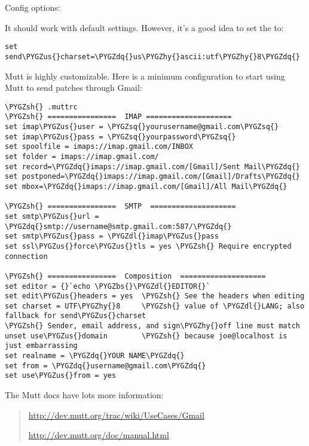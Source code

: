 \documentclass[a4paper,8pt,english]{sphinxmanual}
\def\PYGZbs{\char`\\}
\def\PYGZus{\char`\_}
\def\PYGZsh{\char`\#}
\def\PYGZdl{\char`\$}
\def\PYGZhy{\char`\-}
\def\PYGZsq{\char`\'}
\def\PYGZdq{\char`\"}
\renewcommand\PYGZsq{\textquotesingle}
\begin{document}
Config options:

It should work with default settings.
However, it's a good idea to set the  to:

\begin{Verbatim}[commandchars=\\\{\}]
set send\PYGZus{}charset=\PYGZdq{}us\PYGZhy{}ascii:utf\PYGZhy{}8\PYGZdq{}
\end{Verbatim}

Mutt is highly customizable. Here is a minimum configuration to start
using Mutt to send patches through Gmail:

\begin{Verbatim}[commandchars=\\\{\}]
\PYGZsh{} .muttrc
\PYGZsh{} ================  IMAP ====================
set imap\PYGZus{}user = \PYGZsq{}yourusername@gmail.com\PYGZsq{}
set imap\PYGZus{}pass = \PYGZsq{}yourpassword\PYGZsq{}
set spoolfile = imaps://imap.gmail.com/INBOX
set folder = imaps://imap.gmail.com/
set record=\PYGZdq{}imaps://imap.gmail.com/[Gmail]/Sent Mail\PYGZdq{}
set postponed=\PYGZdq{}imaps://imap.gmail.com/[Gmail]/Drafts\PYGZdq{}
set mbox=\PYGZdq{}imaps://imap.gmail.com/[Gmail]/All Mail\PYGZdq{}

\PYGZsh{} ================  SMTP  ====================
set smtp\PYGZus{}url = \PYGZdq{}smtp://username@smtp.gmail.com:587/\PYGZdq{}
set smtp\PYGZus{}pass = \PYGZdl{}imap\PYGZus{}pass
set ssl\PYGZus{}force\PYGZus{}tls = yes \PYGZsh{} Require encrypted connection

\PYGZsh{} ================  Composition  ====================
set editor = {}`echo \PYGZbs{}\PYGZdl{}EDITOR{}`
set edit\PYGZus{}headers = yes  \PYGZsh{} See the headers when editing
set charset = UTF\PYGZhy{}8     \PYGZsh{} value of \PYGZdl{}LANG; also fallback for send\PYGZus{}charset
\PYGZsh{} Sender, email address, and sign\PYGZhy{}off line must match
unset use\PYGZus{}domain        \PYGZsh{} because joe@localhost is just embarrassing
set realname = \PYGZdq{}YOUR NAME\PYGZdq{}
set from = \PYGZdq{}username@gmail.com\PYGZdq{}
set use\PYGZus{}from = yes
\end{Verbatim}

The Mutt docs have lots more information:
\begin{quote}

\href{http://dev.mutt.org/trac/wiki/UseCases/Gmail}{http://dev.mutt.org/trac/wiki/UseCases/Gmail}

\href{http://dev.mutt.org/doc/manual.html}{http://dev.mutt.org/doc/manual.html}
\end{quote}
\end{document}
